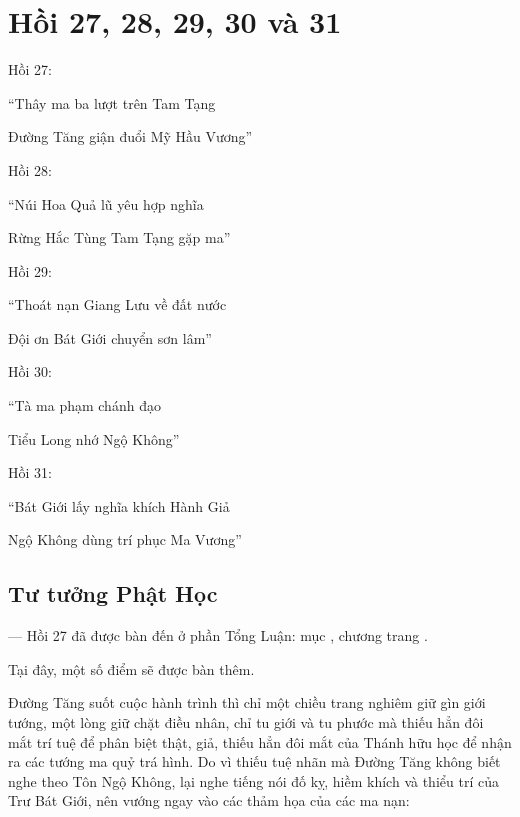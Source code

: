 \chapter{Hồi 27, 28, 29, 30 và 31} %
\label{cha:hoi_27_28}

Hồi 27:

\begin{itshape}
``Thây ma ba lượt trên Tam Tạng

Đường Tăng giận đuổi Mỹ Hầu Vương''
\end{itshape}

Hồi 28:

\begin{itshape}
``Núi Hoa Quả lũ yêu hợp nghĩa

Rừng Hắc Tùng Tam Tạng gặp ma''
\end{itshape}

Hồi 29:

\begin{itshape}
``Thoát nạn Giang Lưu về đất nước 

Đội ơn Bát Giới chuyển sơn lâm''
\end{itshape}

Hồi 30:

\begin{itshape}
``Tà ma phạm chánh đạo

Tiểu Long nhớ Ngộ Không''
\end{itshape}

Hồi 31:

\begin{itshape}
``Bát Giới lấy nghĩa khích Hành Giả

Ngộ Không dùng trí phục Ma Vương''
\end{itshape}

\section{Tư tưởng Phật Học} %
\label{sec:27_28_phat_hoc}

— Hồi 27 đã được bàn đến ở phần Tổng Luận: mục , chương  trang \pageref{sec:bieu_tuong_cua_hoi_thu_26}.

Tại đây, một số điểm sẽ được bàn thêm.

Đường Tăng suốt cuộc hành trình thì chỉ một chiều trang nghiêm giữ gìn giới tướng, một lòng giữ chặt điều nhân, chỉ tu giới và tu phước mà thiếu hẳn đôi mắt trí tuệ để phân biệt thật, giả, thiếu hẳn đôi mắt của Thánh hữu học để nhận ra các tướng ma quỷ trá hình. Do vì thiếu tuệ nhãn mà Đường Tăng không biết nghe theo Tôn Ngộ Không, lại nghe tiếng nói đố kỵ, hiềm khích và thiểu trí của Trư Bát Giới, nên vướng ngay vào các thảm họa của các ma nạn:

